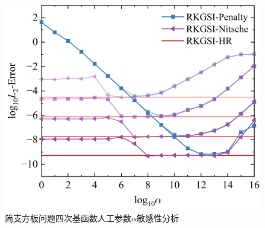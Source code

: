 \begin{figure}[H]
    \centering
    \includegraphics[scale=0.5]{figure/PHR/R/qalpha.png}
    \caption{简支方板问题四次基函数人工参数$\alpha$敏感性分析}\label{qalpha}
\end{figure}
